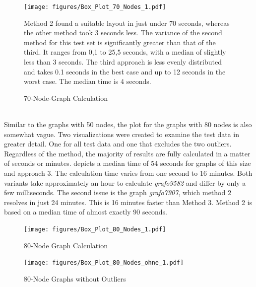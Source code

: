 \documentclass[bachelor, english]{algothesis}
\begin{document}
\noindent
\begin{figure}[ht]
  \centering
  \begin{minipage}{0.5\textwidth}
          \hspace{-1.3cm}
            \texttt{[image: figures/Box\_Plot\_70\_Nodes\_1.pdf]} 
  \caption{70-Node-Graph Calculation}
  \label{fig:Calc_70_Nodes}
  \end{minipage}
  \begin{minipage}{0.4\textwidth}
         \vspace{+0.6cm}
Method 2 found a suitable layout in just under 70 seconds, whereas the other method took 3 seconds less. The variance of the second method for this test set is significantly greater than that of the third. It ranges from 0,1 to 25,5 seconds, with a median of slightly less than 3 seconds. The third approach is less evenly distributed and takes 0.1 seconds in the best case and up to 12 seconds in the worst case. The median time is 4 seconds.  
  \end{minipage}
\end{figure}
\\
\noindent
Similar to the graphs with 50 nodes, the plot for the graphs with 80 nodes is also somewhat vague. Two visualizations were created to examine the test data in greater detail. One for all test data and one that excludes the two outliers. Regardless of the method, the majority of results are fully calculated in a matter of seconds or minutes.  depicts a median time of 54 seconds for graphs of this size and approach 3. The calculation time varies from one second to 16 minutes. Both variants take approximately an hour to calculate \textit{grafo9582} and differ by only a few milliseconds. The second issue is the graph \textit{grafo7907}, which method 2 resolves in just 24 minutes. This is 16 minutes faster than Method 3. Method 2 is based on a median time of almost exactly 90 seconds.
\begin{figure}[ht]
  \centering
  \begin{minipage}{0.5\textwidth}
         \hspace{-1.8cm}
          \texttt{[image: figures/Box\_Plot\_80\_Nodes\_1.pdf]} 
  \caption{80-Node Graph Calculation}
  \label{fig:Calc_80_Nodes}
  \end{minipage}%
  \begin{minipage}{0.5\textwidth}
        \hspace{-0.3cm}
          \texttt{[image: figures/Box\_Plot\_80\_Nodes\_ohne\_1.pdf]} 
  \caption{80-Node Graphs without Outliers}
  \label{fig:Calc_80_Nodes_ohne}
  \end{minipage}
\end{figure}
\end{document}
